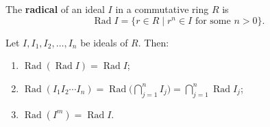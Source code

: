 The \textbf{radical} of an ideal $I$ in a commutative ring $R$ is
\[
\operatorname{Rad} I = \{ r \in R \mid r^n \in I \text{ for some } n > 0 \}.
\]

Let $I, I_1, I_2, \ldots, I_n$ be ideals of $R$. Then:
\begin{enumerate}
  \item $\operatorname{Rad}(\operatorname{Rad} I) = \operatorname{Rad} I$;
  \item $\operatorname{Rad}(I_1 I_2 \cdots I_n) = \operatorname{Rad}\bigl(\bigcap_{j=1}^{n} I_j\bigr) = \bigcap_{j=1}^{n} \operatorname{Rad} I_j$;
  \item $\operatorname{Rad}(I^m) = \operatorname{Rad} I$.
\end{enumerate}

